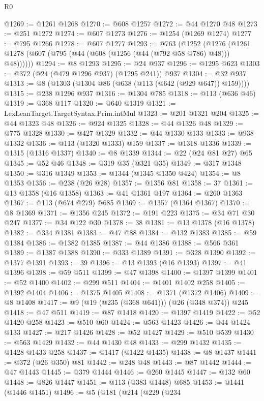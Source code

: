 \begin{lexlean}{R0}
\begin{coremodule}
{{{{{{{{{{{{{{{{{{{{{{{{{{{{{{{{{{{{{{{{{{{{{{{{{{{{{{{{{{{{{{{{{{{{{{{{{@1269 := @1261 @1268
@1270 := @608 @1257
@1272 := @44 @1270 @48
@1273 := @251 @1272
@1274 := @607 @1273
@1276 := @1254 (@1269 @1274)
@1277 := @795 @1266
@1278 := @607 @1277
@1293 := @763
    (@1252 (@1276 (@1261 @1278 (@607 (@795 (@44 (@608 (@1256 (@44 (@792 @58 @786) @48))) @48))))))
@1294 := @8 @1293
@1295 := @24 @937
@1296 := @1295 @623
@1303 := @372 (@24 (@479 @1296 @937) (@1295 @241)) @937
@1304 := @32 @937
@1313 := @8 (@1303 (@1304 @86 (@638 (@113 (@642 (@929 @647)) @159))))
@1315 := @238 @1296 @937
@1316 := @1304 @785
@1318 := @113 (@636 @46)
@1319 := @368 @117
@1320 := @640 @1319
@1321 := LexLeanTarget.TargetSyntax.Prim.intMul
@1323 := @201 @1321 @204
@1325 := @44 @1323 @48
@1326 := @924 @1325
@1328 := @44 @1326 @48
@1329 := @775 @1328
@1330 := @427 @1329
@1332 := @44 @1330 @133
@1333 := @938 @1332
@1336 := @113 (@1320 @1333) @159
@1337 := @1318 @1336
@1339 := @1315 (@1316 @1337)
@1340 := @8 @1339
@1344 := @22 (@24 @81 @27) @65
@1345 := @52 @46
@1348 := @319 @35 (@321 @35)
@1349 := @317 @1348
@1350 := @316 @1349
@1353 := @1344 (@1345 @1350 @424)
@1354 := @8 @1353
@1356 := @238 (@26 @28)
@1357 := @1356 @81
@1358 := 37
@1361 := @13 @1358 (@16 @1358)
@1363 := @41 @1361 @197
@1364 := @260 @1363
@1367 := @113 (@674 @279) @685
@1369 := @1357 (@1364 @1367)
@1370 := @8 @1369
@1371 := @1356 @245
@1372 := @191 @223
@1375 := @34 @71 @30 @247
@1377 := @34 @122 @30
@1378 := 38
@1381 := @13 @1378 (@16 @1378)
@1382 := @334 @1381
@1383 := @47 @88
@1384 := @132 @1383
@1385 := @59 @1384
@1386 := @1382 @1385
@1387 := @44 @1386
@1388 := @566 @361
@1389 := @1387 @1388
@1390 := @333 @1389
@1391 := @328 @1390
@1392 := @1377 @1391
@1393 := 39
@1396 := @13 @1393 (@16 @1393)
@1397 := @41 @1396
@1398 := @59 @511
@1399 := @47 @1398
@1400 := @1397 @1399
@1401 := @52 @1400
@1402 := @299 @511
@1404 := @1401 @1402 @258
@1405 := @1392 @1404
@1406 := @1375 @1405
@1408 := @1371 (@1372 @1406)
@1409 := @8 @1408
@1417 := @9 (@19 (@235 (@368 @641))) (@26 (@348 @374)) @245
@1418 := @47 @511
@1419 := @87 @1418
@1420 := @1397 @1419
@1422 := @52 @1420 @258
@1423 := @510 @60
@1424 := @563 @1423
@1426 := @44 @1424 @133
@1427 := @217 @1426
@1428 := @52 @1427
@1429 := @510 @539
@1430 := @563 @1429
@1432 := @44 @1430 @48
@1433 := @299 @1432
@1435 := @1428 @1433 @258
@1437 := @1417 (@1422 @1435)
@1438 := @8 @1437
@1441 := @372 (@26 @350) @81
@1442 := @248 @48
@1443 := @87 @1442
@1444 := @47 @1443
@1445 := @379 @1444
@1446 := @260 @1445
@1447 := @132 @60
@1448 := @826 @1447
@1451 := @113 (@383 @1448) @685
@1453 := @1441 (@1446 @1451)
@1496 := @5
    (@181
      (@214
        (@229
          (@234
}}}}}}}}}}}}}}}}}}}}}}}}}}}}}}}}}}}}}}}}}}}}}}}}}}}}}}}}}}}}}}}}}}}}}}}}}
\end{coremodule}
\end{lexlean}
